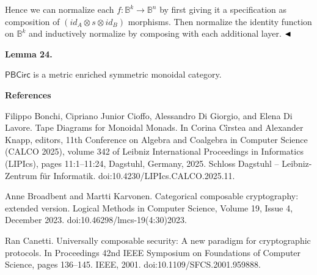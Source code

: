 \documentclass[10pt,a4paper]{article}
\begin{document}
 
  
 
  
Hence we can normalize each $f:\mathbb{B}^{k}\to\mathbb{B}^{n}$ by first giving it a specification as composition of $(\textit{id}_{A}\otimes s\otimes\textit{id}_{B})$ morphisms. Then normalize the identity function on $\mathbb{B}^{k}$ and inductively normalize by composing with each additional layer. $\hfill\blacktriangleleft$\par
 
 
 
\par\medskip\noindent\textbf{Lemma 24.}\par
 
 
$\mathsf{PBCirc}$ is a metric enriched symmetric monoidal category.\par
 
 
 


 
\par\medskip\noindent\textbf{References}\par
  
\par\noindent  [1]  Filippo Bonchi, Cipriano Junior Cioffo, Alessandro Di Giorgio, and Elena Di Lavore.  Tape Diagrams for Monoidal Monads.  In Corina Cîrstea and Alexander Knapp, editors, 11th Conference on Algebra and Coalgebra in Computer Science (CALCO 2025), volume 342 of Leibniz International Proceedings in Informatics (LIPIcs), pages 11:1–11:24, Dagstuhl, Germany, 2025. Schloss Dagstuhl – Leibniz-Zentrum für Informatik.  doi:10.4230/LIPIcs.CALCO.2025.11.  
 
\par\noindent  [2]  Anne Broadbent and Martti Karvonen.  Categorical composable cryptography: extended version.  Logical Methods in Computer Science, Volume 19, Issue 4, December 2023.  doi:10.46298/lmcs-19(4:30)2023.  
 
\par\noindent  [3]  Ran Canetti.  Universally composable security: A new paradigm for cryptographic protocols.  In Proceedings 42nd IEEE Symposium on Foundations of Computer Science, pages 136–145. IEEE, 2001.  doi:10.1109/SFCS.2001.959888.  
 
\end{document}
